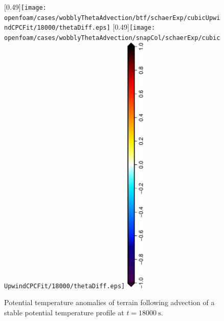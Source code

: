 \begin{figure}
	\captionsetup[subfigure]{position=b}
	\centering
	[0.49\textwidth]{\texttt{[image: openfoam/cases/wobblyThetaAdvection/btf/schaerExp/cubicUpwindCPCFit/18000/thetaDiff.eps]}}
	\hfill
	[0.49\textwidth]{\texttt{[image: openfoam/cases/wobblyThetaAdvection/snapCol/schaerExp/cubicUpwindCPCFit/18000/thetaDiff.eps]}}
	\includegraphics[height=5in,angle=270]{legends/thetaDiffWide.eps}
%
	\caption{Potential temperature anomalies of terrain following advection of a stable potential temperature profile at $t = \SI{18000}{\second}$.}
	\label{fig:wobblyThetaAdvection:thetaDiff}
\end{figure}
